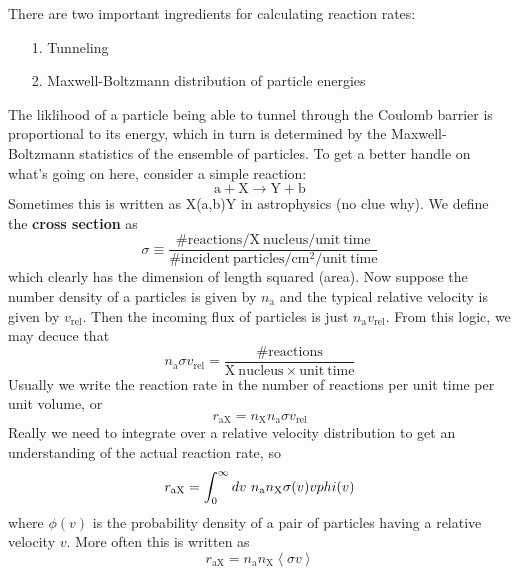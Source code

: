 \documentclass[10pt]{article}
\numberwithin{equation}{section}
\newcommand{\n}{\noindent}
\newcommand{\avg}[1]{\left\langle#1\right\rangle}
\begin{document}
  \n There are two important ingredients for calculating reaction
  rates:
  \begin{enumerate}
  \item[1.] Tunneling
  \item[2.] Maxwell-Boltzmann distribution of particle energies
  \end{enumerate}
  The liklihood of a particle being able to tunnel through the Coulomb
  barrier is proportional to its energy, which in turn is determined
  by the Maxwell-Boltzmann statistics of the ensemble of particles. To
  get a better handle on what's going on here, consider a simple
  reaction:
  \begin{equation}
    \label{eq:102}
    \mathrm{a+X\to Y+b}
  \end{equation}
  Sometimes this is written as X(a,b)Y in astrophysics (no clue
  why). We define the \textbf{cross section} as 
  \begin{equation}
    \label{eq:103}
    \sigma \equiv \frac{\mathrm{\# reactions/X\ nucleus/unit\
        time}}{\mathrm{\#incident\ particles/cm^2/unit\ time}}
  \end{equation}
  which clearly has the dimension of length squared (area). Now
  suppose the number density of a particles is given by $n_\mathrm{a}$
  and the typical relative velocity is given by
  $v_{\mathrm{rel}}$. Then the incoming flux of particles is just
  $n_\mathrm{a}v_{\mathrm{rel}}$. From this logic, we may decuce that
  \begin{equation}
    \label{eq:104}
    n_\mathrm{a}\sigma
    v_{\mathrm{rel}}=\frac{\mathrm{\#reactions}}{\mathrm{X\ nucleus\times
        unit\ time}}
  \end{equation}
  Usually we write the reaction rate in the number of reactions per
  unit time per unit volume, or
  \begin{equation}
    \label{eq:105}
    r_{\mathrm{aX}}=n_\mathrm{X}n_{\mathrm{a}}\sigma v_{\mathrm{rel}}
  \end{equation}
  Really we need to integrate over a relative velocity distribution to
  get an understanding of the actual reaction rate, so
  \begin{equation}
    \label{eq:106}
    r_{\mathrm{aX}}=\int_0^\infty dv\
    n_\mathrm{a}n_{\mathrm{X}}\sigma(v)v\\phi(v)
  \end{equation}
  where $\phi(v)$ is the probability density of a pair of particles
  having a relative velocity $v$. More often this is written as
  \begin{equation}
    \label{eq:107}
    r_{\mathrm{aX}}=n_\mathrm{a}n_{\mathrm{X}}\avg{\sigma v}
  \end{equation}
\end{document}
